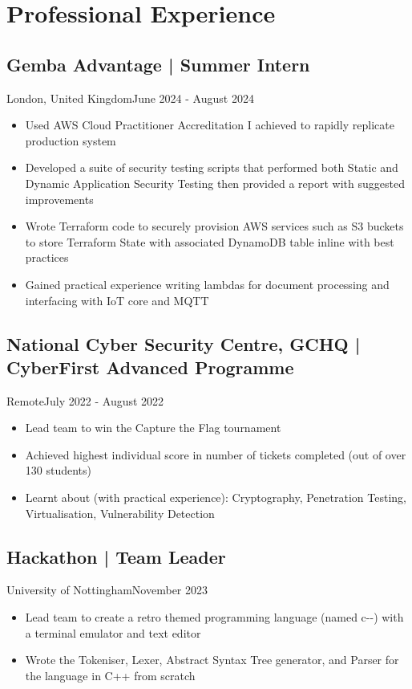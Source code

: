 \section{Professional Experience}
\subsection{Gemba Advantage | Summer Intern}{London, United Kingdom}{June 2024 - August 2024}
\begin{itemize}
    \item Used AWS Cloud Practitioner Accreditation I achieved to rapidly replicate production system
    \item Developed a suite of security testing scripts that performed both Static and Dynamic Application Security Testing then provided a report with suggested improvements
    \item Wrote Terraform code to securely provision AWS services such as S3 buckets to store Terraform State with associated DynamoDB table inline with best practices
    \item Gained practical experience writing lambdas for document processing and interfacing with IoT core and MQTT
\end{itemize}
\subsection{National Cyber Security Centre, GCHQ | CyberFirst Advanced Programme}{Remote}{July 2022 - August 2022}
\begin{itemize}
    \item Lead team to win the Capture the Flag tournament
    \item Achieved highest individual score in number of tickets completed (out of over 130 students)
    \item Learnt about (with practical experience): Cryptography, Penetration Testing, Virtualisation, Vulnerability Detection
\end{itemize}
\subsection{Hackathon | Team Leader}{University of Nottingham}{November 2023}
\begin{itemize}
    \item Lead team to create a retro themed programming language (named c-{-}) with a terminal emulator and text editor
    \item Wrote the Tokeniser, Lexer, Abstract Syntax Tree generator, and Parser for the language in C++ from scratch
\end{itemize}
\vspace{.3em}
